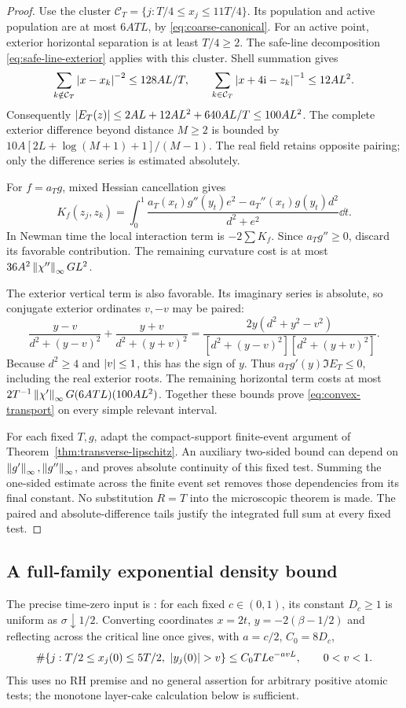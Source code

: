 \begin{proof}
Use the cluster \(\mathcal C_T=\{j:T/4\le x_j\le11T/4\}\).
Its population and active population are at most \(6ATL\), by
\eqref{eq:coarse-canonical}. For an active point, exterior horizontal
separation is at least \(T/4\ge2\). The safe-line decomposition
\eqref{eq:safe-line-exterior} applies with this cluster. Shell summation
gives
\[
 \sum_{k\notin\mathcal C_T}\left|x-x_k\right|^{-2}\le128AL/T,
 \qquad \sum_{k\in\mathcal C_T}\left|x+4\mathrm i-z_k\right|^{-1}\le12AL^2.
\]
Consequently \(\left|E_T(z)\right|\le2AL+12AL^2+640AL/T\le100AL^2\).
The complete exterior difference beyond distance \(M\ge2\) is bounded
by \(10A[2L+\log(M+1)+1]/(M-1)\). The real field retains opposite
pairing; only the difference series is estimated absolutely.

For \(f=a_Tg\), mixed Hessian cancellation gives
\[
 K_f(z_j,z_k)=\int_0^1
  \frac{a_T(x_t)g''(y_t)e^2-a_T''(x_t)g(y_t)d^2}{d^2+e^2}\dd t.
\]
In Newman time the local interaction term is \(-2\sum K_f\).
Since \(a_Tg''\ge0\), discard its favorable contribution. The remaining
curvature cost is at most \(36A^2\left\lVert\chi''\right\rVert_\infty G L^2\).

The exterior vertical term is also favorable. Its imaginary series is
absolute, so conjugate exterior ordinates \(v,-v\) may be paired:
\[
 \frac{y-v}{d^2+(y-v)^2}+\frac{y+v}{d^2+(y+v)^2}
 =\frac{2y(d^2+y^2-v^2)}{[d^2+(y-v)^2][d^2+(y+v)^2]}.
\]
Because \(d^2\ge4\) and \(\left|v\right|\le1\), this has the sign of \(y\).
Thus \(a_Tg'(y)\Im E_T\le0\), including the real exterior roots.
The remaining horizontal term costs at most
\(2T^{-1}\left\lVert\chi'\right\rVert_\infty G(6ATL)(100AL^2)\).
Together these bounds prove \eqref{eq:convex-transport} on every
simple relevant interval.

For each fixed \(T,g\), adapt the compact-support finite-event argument
of Theorem~\ref{thm:transverse-lipschitz}. An auxiliary two-sided
bound can depend on \(\left\lVert g'\right\rVert_\infty,\left\lVert g''\right\rVert_\infty\), and proves
absolute continuity of this fixed test. Summing the one-sided estimate
across the finite event set removes those dependencies from its final
constant. No substitution \(R=T\) into the microscopic theorem is made.
The paired and absolute-difference tails justify the integrated full
sum at every fixed test.
\end{proof}

\subsection{A full-family exponential density bound}
The precise time-zero input is \cite[Theorem 2.4 and Section 4 (18)]{MaplesRodgers2015}:
for each fixed \(c\in(0,1)\), its constant \(D_c\ge1\) is uniform
as \(\sigma\downarrow1/2\). Converting coordinates
\(x=2t\), \(y=-2(\beta-1/2)\) and reflecting across the critical line
once gives, with \(a=c/2\), \(C_0=8D_c\),
\begin{equation}\label{eq:initial-density-tail}
 \#\{j:T/2\le x_j(0)\le5T/2,\ \abs{y_j(0)}>v\}
 \le C_0TL\ee^{-avL},\qquad 0<v<1.
\end{equation}
This uses no RH premise and no general assertion for arbitrary positive
atomic tests; the monotone layer-cake calculation below is sufficient.


